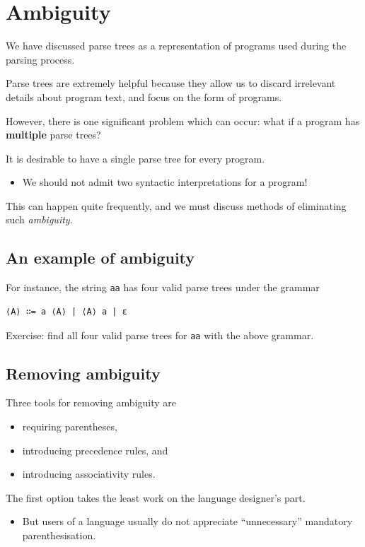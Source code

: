 \documentclass[11pt]{article}
\theoremstyle{definition}
\begin{document}
\section{Ambiguity}
\label{sec:org125ae96}
We have discussed parse trees as a representation
of programs used during the parsing process.

Parse trees are extremely helpful because they allow us
to discard irrelevant details about program text,
and focus on the form of programs.

However, there is one significant problem which can occur:
what if a program has \textbf{multiple} parse trees?

It is desirable to have a single parse tree for every program.
\begin{itemize}
\item We should not admit two syntactic interpretations for a program!
\end{itemize}

This can happen quite frequently, and we must discuss
methods of eliminating such \emph{ambiguity}.

\subsection{An example of ambiguity}
\label{sec:org70ba837}
For instance, the string \texttt{aa} has four valid parse trees
under the grammar
\begin{verbatim}
⟨A⟩ ∷= a ⟨A⟩ | ⟨A⟩ a | ε 
\end{verbatim}

Exercise: find all four valid parse trees for \texttt{aa} with the above
grammar.

\subsection{Removing ambiguity}
\label{sec:org6e95f3d}
Three tools for removing ambiguity are
\begin{itemize}
\item requiring parentheses,
\item introducing precedence rules, and
\item introducing associativity rules.
\end{itemize}

The first option takes the least work on the language designer's part.
\begin{itemize}
\item But users of a language usually do not appreciate
“unnecessary” mandatory parenthesisation.
\end{itemize}
\end{document}
